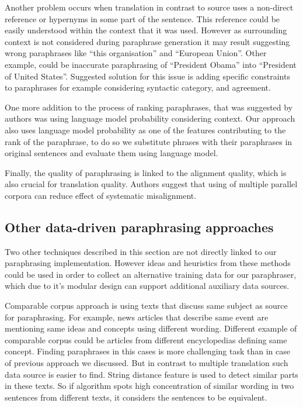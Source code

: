 Another problem occurs when translation in contrast to source uses a non-direct reference or hypernyms in some part of the sentence. This reference could be easily understood within the context that it was used. However as surrounding context is not considered during paraphrase generation it may result suggesting wrong paraphrases like ``this organisation'' and ``European Union''. Other example, could be inaccurate paraphrasing of ``President Obama'' into ``President of United States''. Suggested solution for this issue is adding specific constraints to paraphrases for example considering syntactic category, and agreement.

One more addition to the process of ranking paraphrases, that was suggested by authors was using language model probability  considering context. Our approach also uses language model probability as one of the features contributing to the rank of the paraphrase, to do so we substitute phrases with their paraphrases in original sentences and evaluate them using language model.

Finally, the quality of paraphrasing is linked to the alignment quality, which is also crucial for translation quality. Authors suggest that using of multiple parallel corpora can reduce effect of systematic misalignment.


\subsection{Other data-driven paraphrasing approaches}

Two other techniques described in this section are not directly linked to our paraphrasing implementation. However ideas and heuristics from these methods could be used in order to collect an alternative training data for our paraphraser, which due to it's modular design can support additional auxiliary data sources.  

Comparable corpus approach is using texts that discuss same subject as source for paraphrasing. For example, news articles that describe same event are mentioning same ideas and concepts using different wording. Different example of comparable corpus could be articles from different encyclopedias defining same concept. Finding paraphrases in this cases is more challenging task than in case of previous approach we discussed. But in contrast to multiple translation such data source is easier to find. String distance feature is used to detect similar parts in these texts. So if algorithm spots high concentration of similar wording in two sentences from different texts, it considers the sentences to be equivalent. 

